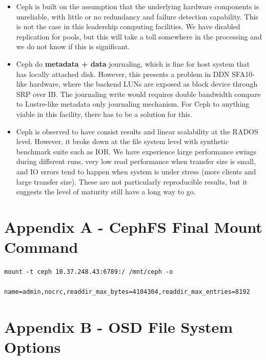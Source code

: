 \documentclass{article}
\begin{document}
\begin{itemize}

  \item Ceph is built on the assumption that the underlying hardware components
  is unreliable, with little or no redundancy and failure detection capability.
  This is not the case in this leadership computing facilities. We have disabled
  replication for pools, but this will take a toll somewhere in the processing
  and we do not know if this is significant.

  \item Ceph do \textbf{metadata + data} journaling, which is fine for host
  system that has locally attached disk. However, this presents a problem in DDN
  SFA10-like hardware, where the backend LUNs are exposed as block device
  through SRP over IB. The journaling write would requires double bandwidth
  compare to Lustre-like metadata only journaling mechanism. For Ceph to anything
  viable in this facility, there has to be a solution for this.

  \item Ceph is observed to have consist results and linear scalability at the
  RADOS level. However, it broke down at the file system level with synthetic
  benchmark suite such as IOR. We have experience large performance swings
  during different runs, very low read performance when transfer size is small,
  and IO errors tend to happen when system is under stress (more clients and
  large transfer size). These are not particularly reproducible results, but it
  suggests the level of maturity still have a long way to go.
  
\end{itemize}

\section*{Appendix A - CephFS Final Mount Command}

\begin{Verbatim}
mount -t ceph 10.37.248.43:6789:/ /mnt/ceph -o
      name=admin,nocrc,readdir_max_bytes=4104304,readdir_max_entries=8192
\end{Verbatim}


\section*{Appendix B - OSD File System Options}
\end{document}
